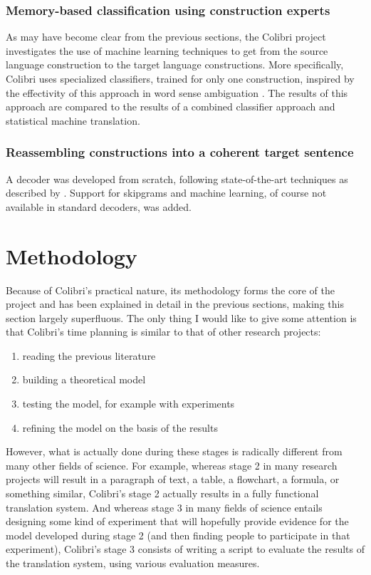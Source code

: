 \documentclass[12pt]{article}
\begin{document}
\subsubsection{Memory-based classification using construction experts}
As may have become clear from the previous sections, the Colibri project investigates the use of machine learning techniques to get from the source language construction to the target language constructions. More specifically, Colibri uses specialized classifiers, trained for only one construction, inspired by the effectivity of this approach in word sense ambiguation \citep{vangompel10}. The results of this approach are compared to the results of a combined classifier approach and statistical machine translation.

\subsubsection{Reassembling constructions into a coherent target sentence}
A decoder was developed from scratch, following state-of-the-art techniques as described by \citet{koehn03}. Support for skipgrams and machine learning, of course not available in standard decoders, was added.




\section{Methodology}

Because of Colibri's practical nature, its methodology forms the core of the project and has been explained in detail in the previous sections, making this section largely superfluous. The only thing I would like to give some attention is that Colibri's time planning is similar to that of other research projects:

\begin{enumerate}
\item reading the previous literature
\item building a theoretical model
\item testing the model, for example with experiments
\item refining the model on the basis of the results
\end{enumerate}

However, what is actually done during these stages is radically different from many other fields of science. For example, whereas stage 2 in many research projects will result in a paragraph of text, a table, a flowchart, a formula, or something similar, Colibri's stage 2 actually results in a fully functional translation system. And whereas stage 3 in many fields of science entails designing some kind of experiment that will hopefully provide evidence for the model developed during stage 2 (and then finding people to participate in that experiment), Colibri's stage 3 consists of writing a script to evaluate the results of the translation system, using various evaluation measures.
\end{document}

